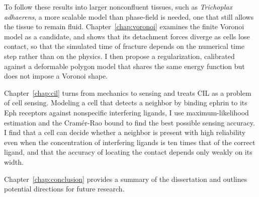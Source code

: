 To follow these results into larger nonconfluent tissues, such as \textit{Trichoplax adhaerens}, a more scalable model than phase-field is needed, one that still allows the tissue to remain fluid.
Chapter~\ref{chap:voronoi} examines the finite Voronoi model as a candidate, and shows that its detachment forces diverge as cells lose contact, so that the simulated time of fracture depends on the numerical time step rather than on the physics.
I then propose a regularization, calibrated against a deformable polygon model that shares the same energy function but does not impose a Voronoi shape.

Chapter~\ref{chap:cil} turns from mechanics to sensing and treats CIL as a problem of cell sensing.
Modeling a cell that detects a neighbor by binding ephrin to its Eph receptors against nonspecific interfering ligands, I use maximum-likelihood estimation and the Cram\'er-Rao bound to find the best possible sensing accuracy.
I find that a cell can decide whether a neighbor is present with high reliability even when the concentration of interfering ligands is ten times that of the correct ligand, and that the accuracy of locating the contact depends only weakly on its width.

Chapter~\ref{chap:conclusion} provides a summary of the dissertation and outlines potential directions for future research.
